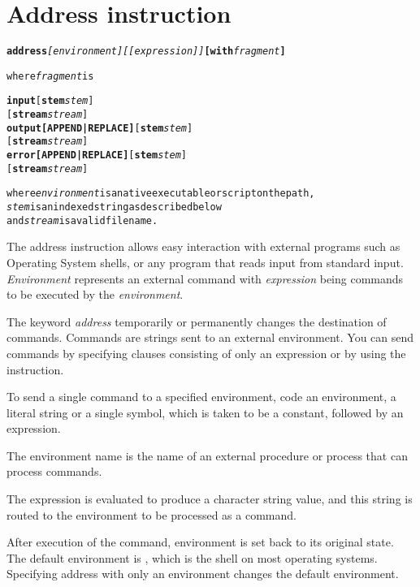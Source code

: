\chapter{Address instruction}\label{refaddress}
\begin{shaded}
  \begin{alltt}
  \textbf{address} \emph{[environment]} \emph{[[expression]]} \textbf{[with} \emph{fragment}\textbf{]}

  where \emph{fragment} is
  
  \textbf{input} [\textbf{stem} \emph{stem}]
        [\textbf{stream} \emph{stream}]
	  \textbf{output} \textbf{[APPEND|REPLACE]} [\textbf{stem} \emph{stem}]
                          [\textbf{stream} \emph{stream}]
	  \textbf{error} \textbf{[APPEND|REPLACE]} [\textbf{stem} \emph{stem}]
                         [\textbf{stream} \emph{stream}]
                
where \emph{environment} is a native executable or script on the path,
\emph{stem} is an indexed string as described below
and \emph{stream} is a valid filename.
\end{alltt}

% 
\end{shaded}
The address instruction allows easy interaction with external programs such as Operating System shells, or any program that reads 
input from standard input. \emph{Environment} represents an external command with \emph{expression} being commands to be executed 
by the \emph{environment}. 

The keyword \emph{address} temporarily or permanently changes the destination of commands. Commands are strings sent to an external environment. 
You can send commands by specifying clauses consisting of only an expression or by using the  instruction.

To send a single command to a specified environment, code an
environment, a literal string or a single symbol, which is taken to be
a constant, followed by an expression.

The environment name is the
name of an external procedure or process that can process
commands.

The expression is evaluated to produce a character string
value, and this string is routed to the environment to be processed as
a command.

After execution of the command, environment is set back to
its original state. The default environment is , which is the shell
on most operating systems. Specifying address with only an environment changes the default environment.

